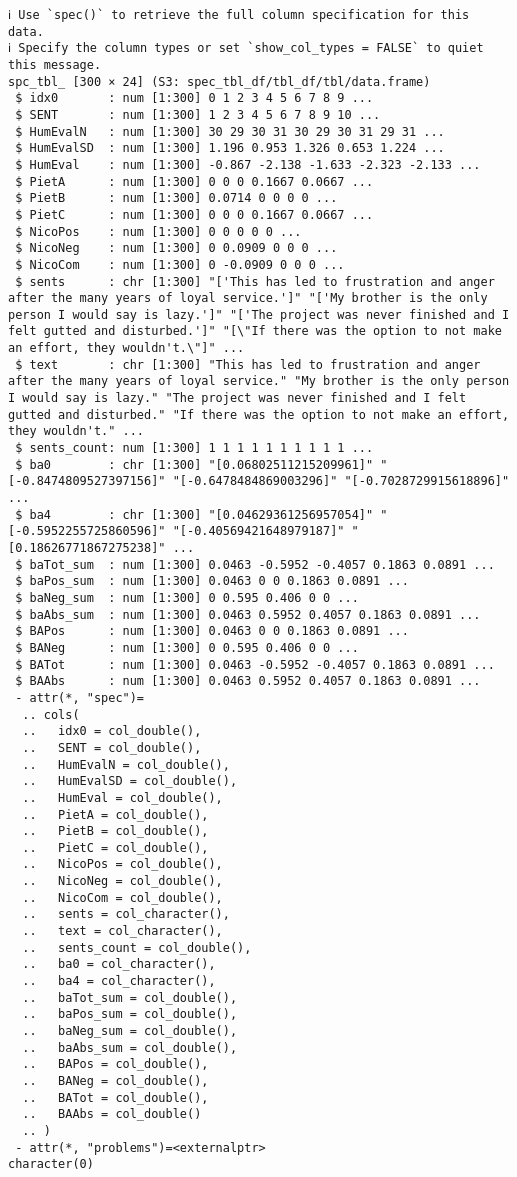 \documentclass[a4paper,10pt,onecolumn,oneside,openright]{article}
\begin{document}
\begin{verbatim}
ℹ Use `spec()` to retrieve the full column specification for this data.
ℹ Specify the column types or set `show_col_types = FALSE` to quiet this message.
spc_tbl_ [300 × 24] (S3: spec_tbl_df/tbl_df/tbl/data.frame)
 $ idx0       : num [1:300] 0 1 2 3 4 5 6 7 8 9 ...
 $ SENT       : num [1:300] 1 2 3 4 5 6 7 8 9 10 ...
 $ HumEvalN   : num [1:300] 30 29 30 31 30 29 30 31 29 31 ...
 $ HumEvalSD  : num [1:300] 1.196 0.953 1.326 0.653 1.224 ...
 $ HumEval    : num [1:300] -0.867 -2.138 -1.633 -2.323 -2.133 ...
 $ PietA      : num [1:300] 0 0 0 0.1667 0.0667 ...
 $ PietB      : num [1:300] 0.0714 0 0 0 0 ...
 $ PietC      : num [1:300] 0 0 0 0.1667 0.0667 ...
 $ NicoPos    : num [1:300] 0 0 0 0 0 ...
 $ NicoNeg    : num [1:300] 0 0.0909 0 0 0 ...
 $ NicoCom    : num [1:300] 0 -0.0909 0 0 0 ...
 $ sents      : chr [1:300] "['This has led to frustration and anger after the many years of loyal service.']" "['My brother is the only person I would say is lazy.']" "['The project was never finished and I felt gutted and disturbed.']" "[\"If there was the option to not make an effort, they wouldn't.\"]" ...
 $ text       : chr [1:300] "This has led to frustration and anger after the many years of loyal service." "My brother is the only person I would say is lazy." "The project was never finished and I felt gutted and disturbed." "If there was the option to not make an effort, they wouldn't." ...
 $ sents_count: num [1:300] 1 1 1 1 1 1 1 1 1 1 ...
 $ ba0        : chr [1:300] "[0.06802511215209961]" "[-0.8474809527397156]" "[-0.6478484869003296]" "[-0.7028729915618896]" ...
 $ ba4        : chr [1:300] "[0.04629361256957054]" "[-0.5952255725860596]" "[-0.40569421648979187]" "[0.18626771867275238]" ...
 $ baTot_sum  : num [1:300] 0.0463 -0.5952 -0.4057 0.1863 0.0891 ...
 $ baPos_sum  : num [1:300] 0.0463 0 0 0.1863 0.0891 ...
 $ baNeg_sum  : num [1:300] 0 0.595 0.406 0 0 ...
 $ baAbs_sum  : num [1:300] 0.0463 0.5952 0.4057 0.1863 0.0891 ...
 $ BAPos      : num [1:300] 0.0463 0 0 0.1863 0.0891 ...
 $ BANeg      : num [1:300] 0 0.595 0.406 0 0 ...
 $ BATot      : num [1:300] 0.0463 -0.5952 -0.4057 0.1863 0.0891 ...
 $ BAAbs      : num [1:300] 0.0463 0.5952 0.4057 0.1863 0.0891 ...
 - attr(*, "spec")=
  .. cols(
  ..   idx0 = col_double(),
  ..   SENT = col_double(),
  ..   HumEvalN = col_double(),
  ..   HumEvalSD = col_double(),
  ..   HumEval = col_double(),
  ..   PietA = col_double(),
  ..   PietB = col_double(),
  ..   PietC = col_double(),
  ..   NicoPos = col_double(),
  ..   NicoNeg = col_double(),
  ..   NicoCom = col_double(),
  ..   sents = col_character(),
  ..   text = col_character(),
  ..   sents_count = col_double(),
  ..   ba0 = col_character(),
  ..   ba4 = col_character(),
  ..   baTot_sum = col_double(),
  ..   baPos_sum = col_double(),
  ..   baNeg_sum = col_double(),
  ..   baAbs_sum = col_double(),
  ..   BAPos = col_double(),
  ..   BANeg = col_double(),
  ..   BATot = col_double(),
  ..   BAAbs = col_double()
  .. )
 - attr(*, "problems")=<externalptr>
character(0)
\end{verbatim}
\end{document}
